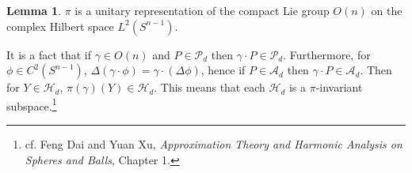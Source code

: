 \documentclass{article}
\theoremstyle{definition}
\newtheorem{lemma}[theorem]{Lemma}
\theoremstyle{definition}
\begin{document}
\begin{lemma}
$\pi$ is a unitary representation of the compact Lie group $O(n)$ on the complex Hilbert space $L^2(S^{n-1})$. 
\end{lemma}

It is a fact that if $\gamma \in O(n)$ and $P \in \mathscr{P}_d$ then $\gamma \cdot P \in \mathscr{P}_d$. 
Furthermore, for $\phi \in C^2(S^{n-1})$, $\Delta (\gamma\cdot \phi) = \gamma \cdot (\Delta \phi)$, hence
if $P \in \mathscr{A}_d$ then $\gamma \cdot P \in \mathscr{A}_d$. 
Then for $Y \in \mathscr{H}_d$, $\pi(\gamma)(Y)  \in \mathscr{H}_d$. This means that
each $\mathscr{H}_d$ is a $\pi$-invariant subspace.\footnote{cf. Feng Dai and Yuan Xu,
{\em Approximation Theory and Harmonic Analysis on Spheres and Balls},
Chapter 1.}
\end{document}
